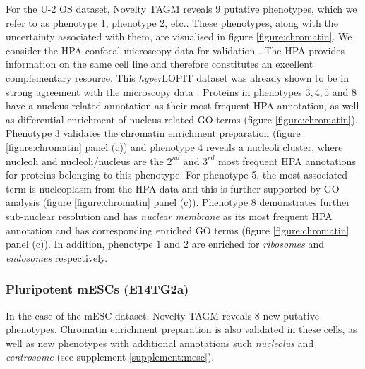 \documentclass[12pt,english]{article}
\begin{document}
For the U-2 OS dataset, Novelty TAGM reveals $9$ putative phenotypes, which we refer to as phenotype 1, phenotype 2, etc.. These phenotypes, along with the uncertainty associated with them, are visualised in figure \ref{figure:chromatin}. We consider the HPA confocal microscopy data for validation \citep{Thul:2017, Sullivan:2018}. The HPA provides information on the same cell line and therefore constitutes an excellent complementary resource. This \textit{hyper}LOPIT dataset was already shown to be in strong agreement with the microscopy data \citep{Thul:2017, DC:2018}. Proteins in phenotypes $3,4,5$ and $8$ have a nucleus-related annotation as their most frequent HPA annotation, as well as differential enrichment of nucleus-related GO terms (figure \ref{figure:chromatin}). Phenotype $3$ validates the chromatin enrichment preparation (figure \ref{figure:chromatin} panel (c)) and phenotype $4$ reveals a nucleoli cluster, where nucleoli and nucleoli/nucleus are the $2^{nd}$ and $3^{rd}$ most frequent HPA annotations for proteins belonging to this phenotype. For phenotype 5, the most associated term is nucleoplasm from the HPA data and this is further supported by GO analysis (figure \ref{figure:chromatin} panel (c)). Phenotype $8$ demonstrates further sub-nuclear resolution and has \textit{nuclear membrane} as its most frequent HPA annotation and has corresponding enriched GO terms (figure \ref{figure:chromatin} panel (c)). In addition, phenotype $1$ and $2$ are enriched for \textit{ribosomes} and \textit{endosomes} respectively.



\subsubsection{Pluripotent mESCs (E14TG2a)}
In the case of the mESC dataset, Novelty TAGM reveals $8$ new putative phenotypes. Chromatin enrichment preparation is also validated in these cells, as well as new phenotypes with additional annotations such \textit{nucleolus} and \textit{centrosome} (see supplement \ref{supplement:mesc}).
\end{document}
